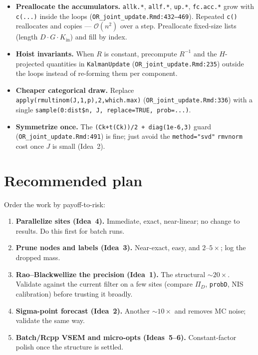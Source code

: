 \documentclass[11pt]{article}
\newcommand{\code}[1]{\texttt{#1}}
\newcommand{\bigO}{\mathcal{O}}
\begin{document}
\begin{itemize}[nosep]
  \item \textbf{Preallocate the accumulators.} \code{allk.*}, \code{allf.*},
        \code{up.*}, \code{fc.acc.*} grow with \code{c(...)} inside the loops
        (\code{OR\_joint\_update.Rmd:432--469}). Repeated \code{c()} reallocates and
        copies --- $\bigO(n^2)$ over a step. Preallocate fixed-size lists (length
        $D\cdot G\cdot K_{\text{in}}$) and fill by index.
  \item \textbf{Hoist invariants.} When $R$ is constant, precompute $R^{-1}$ and the
        $H$-projected quantities in \code{KalmanUpdate} (\code{OR\_joint\_update.Rmd:235})
        outside the loops instead of re-forming them per component.
  \item \textbf{Cheaper categorical draw.} Replace
        \code{apply(rmultinom(J,1,p),2,which.max)} (\code{OR\_joint\_update.Rmd:336})
        with a single \code{sample(0:dist\$n, J, replace=TRUE, prob=...)}.
  \item \textbf{Symmetrize once.} The \code{(Ck+t(Ck))/2 + diag(1e-6,3)} guard
        (\code{OR\_joint\_update.Rmd:491}) is fine; just avoid the \code{method="svd"}
        \code{rmvnorm} cost once $J$ is small (Idea~2).
\end{itemize}

\section{Recommended plan}
\label{sec:plan}

Order the work by payoff-to-risk:
\begin{enumerate}[nosep]
  \item \textbf{Parallelize sites (Idea~4).} Immediate, exact, near-linear; no change to
        results. Do this first for batch runs.
  \item \textbf{Prune nodes and labels (Idea~3).} Near-exact, easy, and $2\text{--}5\times$;
        log the dropped mass.
  \item \textbf{Rao--Blackwellize the precision (Idea~1).} The structural $\sim\!20\times$.
        Validate against the current filter on a few sites (compare $\Pi_D$, \code{probD},
        NIS calibration) before trusting it broadly.
  \item \textbf{Sigma-point forecast (Idea~2).} Another $\sim\!10\times$ and removes MC
        noise; validate the same way.
  \item \textbf{Batch/Rcpp VSEM and micro-opts (Ideas~5--6).} Constant-factor polish once
        the structure is settled.
\end{enumerate}
\end{document}
